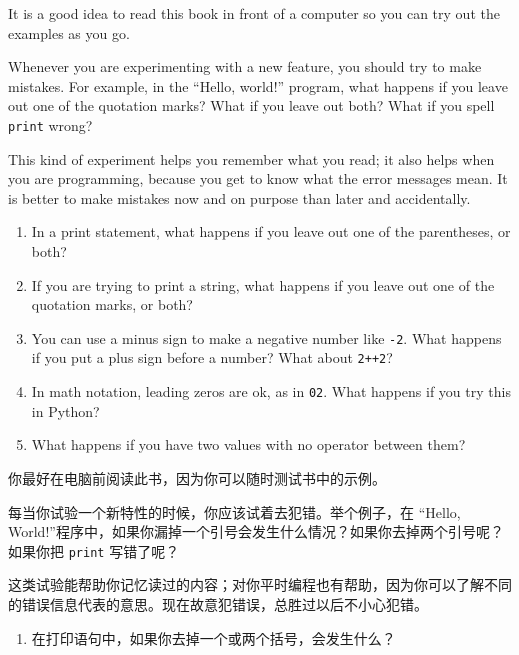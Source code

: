 \begin{exercise}

It is a good idea to read this book in front of a computer so you can
try out the examples as you go.

Whenever you are experimenting with a new feature, you should try
to make mistakes.  For example, in the ``Hello, world!'' program,
what happens if you leave out one of the quotation marks?  What
if you leave out both?  What if you spell {\tt print} wrong?

This kind of experiment helps you remember what you read; it also
helps when you are programming, because you get to know what the error
messages mean.  It is better to make mistakes now and on purpose than
later and accidentally.

\begin{enumerate}

\item In a print statement, what happens if you leave out one
of the parentheses, or both?

\item If you are trying to print a string, what happens if you
leave out one of the quotation marks, or both?

\item You can use a minus sign to make a negative number like
{\tt -2}.  What happens if you put a plus sign before a number?
What about {\tt 2++2}?

\item In math notation, leading zeros are ok, as in {\tt 02}.
What happens if you try this in Python?

\item What happens if you have two values with no operator
between them?

\end{enumerate}


你最好在电脑前阅读此书，因为你可以随时测试书中的示例。

每当你试验一个新特性的时候，你应该试着去犯错。举个例子，在 “Hello, World!”程序中，如果你漏掉一个引号会发生什么情况？如果你去掉两个引号呢？如果你把 \lstinline{print} 写错了呢？

这类试验能帮助你记忆读过的内容；对你平时编程也有帮助，因为你可以了解不同的错误信息代表的意思。现在故意犯错误，总胜过以后不小心犯错。

\begin{enumerate}

\item 在打印语句中，如果你去掉一个或两个括号，会发生什么？


\end{enumerate}
\end{exercise}
